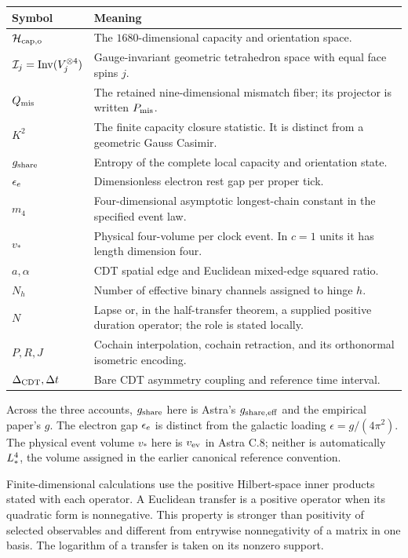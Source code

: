 \begin{longtable}{L{0.20\textwidth}L{0.74\textwidth}}
\toprule Symbol & Meaning\\\midrule\endhead
$\mathcal H_{\rm cap,o}$ & The $1680$-dimensional capacity and orientation space.\\
$\mathcal I_j=\operatorname{Inv}(V_j^{\otimes4})$ & Gauge-invariant geometric tetrahedron space with equal face spins $j$.\\
$Q_{\rm mis}$ & The retained nine-dimensional mismatch fiber; its projector is written $P_{\rm mis}$.\\
$K^2$ & The finite capacity closure statistic. It is distinct from a geometric Gauss Casimir.\\
$g_{\rm share}$ & Entropy of the complete local capacity and orientation state.\\
$\epsilon_e$ & Dimensionless electron rest gap per proper tick.\\
$m_4$ & Four-dimensional asymptotic longest-chain constant in the specified event law.\\
$v_*$ & Physical four-volume per clock event. In $c=1$ units it has length dimension four.\\
$a,\alpha$ & CDT spatial edge and Euclidean mixed-edge squared ratio.\\
$N_h$ & Number of effective binary channels assigned to hinge $h$.\\
$N$ & Lapse or, in the half-transfer theorem, a supplied positive duration operator; the role is stated locally.\\
$P,R,J$ & Cochain interpolation, cochain retraction, and its orthonormal isometric encoding.\\
$\Delta_{\rm CDT},\Delta t$ & Bare CDT asymmetry coupling and reference time interval.\\
\bottomrule
\end{longtable}

Across the three accounts, $g_{\rm share}$ here is Astra's
$g_{\rm share,eff}$ and the empirical paper's $g$.
The electron gap $\epsilon_e$ is distinct from the galactic loading
$\epsilon=g/(4\pi^2)$. The physical event volume $v_*$ here is
$v_{\rm ev}$ in Astra C.8; neither is automatically $L_*^4$,
the volume assigned in the earlier canonical reference convention.

Finite-dimensional calculations use the positive Hilbert-space inner products stated with each operator. A Euclidean transfer is a positive operator when its quadratic form is nonnegative. This property is stronger than positivity of selected observables and different from entrywise nonnegativity of a matrix in one basis. The logarithm of a transfer is taken on its nonzero support.


